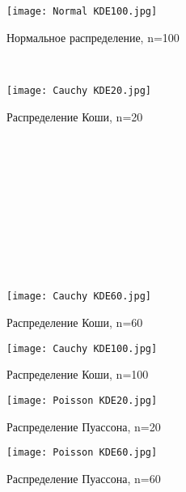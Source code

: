 \documentclass{article}
\begin{document}
\begin{figure}[!ht]
\begin{center}
\texttt{[image: Normal KDE100.jpg]}
\caption{Нормальное распределение, n=100}\label{figure5}
\end{center}
\end{figure}
~\\


\begin{figure}[!ht]
\begin{center}
\texttt{[image: Cauchy KDE20.jpg]}
\caption{Распределение Коши, n=20}\label{figure2}
\end{center}
\end{figure}
~\\
~\\
~\\
~\\
~\\
~\\
~\\
~\\
~\\

\begin{figure}[!ht]
\begin{center}
\texttt{[image: Cauchy KDE60.jpg]}
\caption{Распределение Коши, n=60}\label{figure2}
\end{center}
\end{figure}

\begin{figure}[!ht]
\begin{center}
\texttt{[image: Cauchy KDE100.jpg]}
\caption{Распределение Коши, n=100}\label{figure2}
\end{center}
\end{figure}

\begin{figure}[!ht]
\begin{center}
\texttt{[image: Poisson KDE20.jpg]}
\caption{Распределение Пуассона, n=20}\label{figure4}
\end{center}
\end{figure}

\begin{figure}[!ht]
\begin{center}
\texttt{[image: Poisson KDE60.jpg]}
\caption{Распределение Пуассона, n=60}\label{figure4}
\end{center}
\end{figure}
\end{document}
